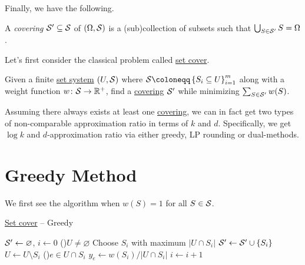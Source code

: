 Finally, we have the following.

\begin{definition}[Covering]\label{def:covering}
	A \emph{covering} \(\mathcal{\MakeUppercase{S}} ^\prime \subseteq \mathcal{\MakeUppercase{S}} \) of \((\Omega , \mathcal{\MakeUppercase{S}} )\) is a (sub)collection of subsets such that \(\bigcup_{S\in \mathcal{\MakeUppercase{S}} ^\prime }S = \Omega\).
\end{definition}

Let's first consider the classical problem called \hyperref[prb:set-cover]{set cover}.

\begin{problem}\label{prb:set-cover}
Given a finite \hyperref[def:set-system]{set system} \((U, \mathcal{\MakeUppercase{S}} )\) where \(\mathcal{\MakeUppercase{S}} \coloneqq \left\{ S_i\subseteq U\right\}_{i=1}^m \) along with a weight function \(w\colon \mathcal{\MakeUppercase{S}} \to \mathbb{\MakeUppercase{r}} ^+\), find a \hyperref[def:covering]{covering} \(\mathcal{\MakeUppercase{S}} ^\prime \) while minimizing \(\sum_{S\in \mathcal{\MakeUppercase{S}} ^\prime }w(S)\).
\end{problem}

Assuming there always exists at least one \hyperref[def:covering]{covering}, we can in fact get two types of non-comparable approximation ratio in terms of \(k\) and \(d\). Specifically, we get \(\log k\) and \(d\)-approximation ratio via either greedy, LP rounding or dual-methods.

\section{Greedy Method}
We first see the algorithm when \(w(S) = 1\) for all \(S\in \mathcal{\MakeUppercase{S}} \).

\begin{algorithm}[H]\label{algo:set-cover-greedy}
	\DontPrintSemicolon
	\caption{\hyperref[prb:set-cover]{Set cover} -- Greedy}
	\BlankLine

	\(\mathcal{\MakeUppercase{S}} ^\prime \gets \varnothing \), \(i\gets 0\)\;
	\While(){\(U \neq \varnothing \)}{
		Choose \(S_i\) with maximum \(\left\vert U \cap S_i \right\vert\)
		\(\mathcal{\MakeUppercase{S}} ^\prime \gets \mathcal{\MakeUppercase{S}} ^\prime \cup \left\{ S_i \right\} \)\;
		\(U\gets U\setminus S_i\)\;\label{line5:algo:set-cover-greedy}
		\For(){\(e\in U \cap S_i\) }{
			\(y_e \gets w(S_{i}) / \left\vert U \cap S_i \right\vert \)
		}
		\(i\gets i+1\)\;
	}
	\;
\end{algorithm}

